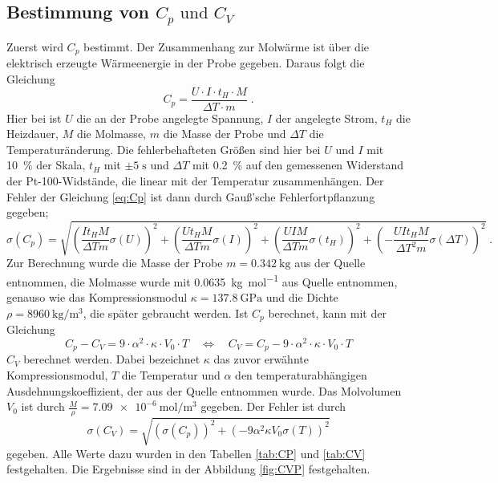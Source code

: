 \subsection{Bestimmung von \texorpdfstring{$C_p \text{ und } C_V$}{math}}
Zuerst wird $C_p$ bestimmt. Der Zusammenhang zur Molwärme ist über die elektrisch erzeugte 
Wärmeenergie in der Probe gegeben. Daraus folgt die Gleichung
\begin{equation}
C_p = \frac{U\cdot I \cdot t_H \cdot M}{\Delta T \cdot m} \; .
\label{eq:Cp}
\end{equation} 
Hier bei ist $U$ die an der Probe angelegte Spannung, $I$ der angelegte Strom, $t_H$ die Heizdauer, 
$M$ die Molmasse, $m$ die Masse der Probe und $\Delta T$ die Temperaturänderung. 
Die fehlerbehafteten Größen sind hier bei $U$ und $I$ mit \SI{10}{\percent} der Skala,
$t_H$ mit $\pm 5\;\si{\second}$ und $\Delta T$ mit \SI{0.2}{\percent} auf den gemessenen Widerstand 
der Pt-100-Widstände, die linear mit der Temperatur zusammenhängen. Der Fehler der 
Gleichung \eqref{eq:Cp} ist dann durch Gauß'sche Fehlerfortpflanzung gegeben;
\begin{equation}
\sigma(C_{p} )= \sqrt{\left(\frac{I t_H  M }{\Delta T  m} \sigma(U) \right)^2 + 
\left(\frac{U t_H  M}{\Delta T  m} \sigma(I) \right)^2 + 
\left(\frac{U  I  M}{\Delta T  m}\sigma(t_H) \right)^2 + 
\left(-\frac{U  I  t_H  M }{ \Delta T^2  m } \sigma(\Delta T) \right)^2 } \; .
\end{equation}
Zur Berechnung wurde die Masse der Probe $m = \SI{0.342}{\kilo\gram}$ aus der Quelle 
\cite{Anleitung} entnommen, die Molmasse wurde mit \SI{0.0635}{\kilo\gram\per\mol} aus Quelle 
\cite{Kupfer} entnommen, genauso wie das Kompressionsmodul $\kappa = \SI{137,8}{\giga\pascal}$ und 
die Dichte $\rho = \SI{8960}{\kilo\gram\per\cubic\meter}$, die später gebraucht werden. Ist $C_p$ 
berechnet, kann mit der Gleichung
\begin{equation}
C_p - C_V = 9\cdot \alpha^2 \cdot  \kappa \cdot V_0 \cdot T 
\quad \iff \quad 
C_V = C_p - 9\cdot \alpha^2 \cdot \kappa \cdot V_0 \cdot T  
\label{eq:Cv}
\end{equation}
$C_V$ berechnet werden.  Dabei bezeichnet $\kappa$ das zuvor erwähnte Kompressionsmodul, $T$ die 
Temperatur und $\alpha$ den temperaturabhängigen Ausdehnungskoeffizient, 
der aus der Quelle \cite{Anleitung} entnommen 
wurde. Das Molvolumen $V_0$ ist durch $\frac{M}{\rho} = \SI{7.09e-6}{\mol\per\cubic\meter}$ 
gegeben. Der Fehler ist durch 
\begin{equation}
\sigma(C_V) = \sqrt{\left(\sigma(C_p) \right)^2 + \left( -9\alpha^2 \kappa V_0 \sigma(T)\right)^2}
\end{equation} 
gegeben. Alle Werte dazu wurden in den Tabellen \ref{tab:CP} und \ref{tab:CV} festgehalten. 
Die Ergebnisse sind in der Abbildung \ref{fig:CVP} festgehalten. 

